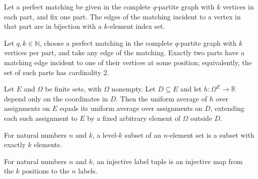 \begin{definition}
\label{FABL.graphMatchingPartEdgeEquiv}
\leanok
{}
Let a perfect matching be given in the complete $q$-partite graph with $k$ vertices in
each part, and fix one part. The edges of the matching incident to a vertex in that part
are in bijection with a $k$-element index set.
\end{definition}

\begin{theorem}
\label{FABL.graphMatchingPartEdges_degree_two}
\leanok
{}
Let $q,k\in\mathbb{N}$, choose a perfect matching in the complete $q$-partite graph with
$k$ vertices per part, and take any edge of the matching. Exactly two parts have a
matching edge incident to one of their vertices at some position; equivalently, the set
of such parts has cardinality $2$.
\end{theorem}

\begin{theorem}
\label{FABL.expect_eq_expect_subtype_of_dependsOn}
\leanok
{}
Let $E$ and $\Omega$ be finite sets, with $\Omega$ nonempty. Let $D\subseteq E$ and let
$h:\Omega^E\to\mathbb{R}$ depend only on the coordinates in $D$. Then the uniform
average of $h$ over assignments on $E$ equals its uniform average over assignments on
$D$, extending each such assignment to $E$ by a fixed arbitrary element of $\Omega$
outside $D$.
\end{theorem}

\begin{definition}
\label{FABL.LevelKSubset}
\leanok
For natural numbers $n$ and $k$, a level-$k$ subset of an $n$-element set is a subset
with exactly $k$ elements.
\end{definition}

\begin{definition}
\label{FABL.InjectiveLabelTuple}
\leanok
For natural numbers $n$ and $k$, an injective label tuple is an injective map from the
$k$ positions to the $n$ labels.
\end{definition}

